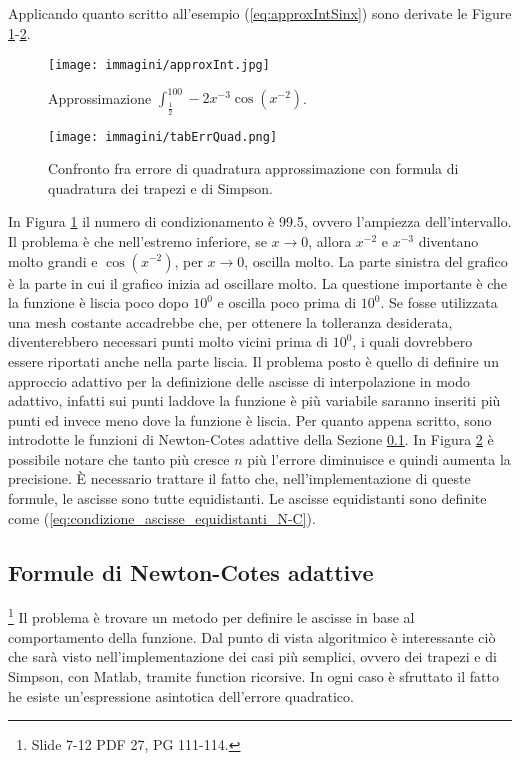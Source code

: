 Applicando quanto scritto all'esempio (\ref{eq:approxIntSinx}) sono derivate le Figure \ref{fig:approxInt}-\ref{fig:tabErrQuad}.

\begin{figure}
    \centering
    \texttt{[image: immagini/approxInt.jpg]}
    \caption{Approssimazione $\int_{\frac{1}{2}}^{100}-2x^{-3}\cos(x^{-2})$.}\label{fig:approxInt}
\end{figure}

\begin{figure}
    \centering
    \texttt{[image: immagini/tabErrQuad.png]}
    \caption{Confronto fra errore di quadratura approssimazione con formula di quadratura dei trapezi e di Simpson.}\label{fig:tabErrQuad}
\end{figure}

In Figura \ref{fig:approxInt} il numero di condizionamento è 99.5, ovvero l'ampiezza dell'intervallo. Il problema è che nell'estremo inferiore, se $x\rightarrow 0$, allora $x^{-2}$ e $x^{-3}$ diventano molto grandi e $\cos{(x^{-2})}$, per $x\rightarrow 0$, oscilla molto. La parte sinistra del grafico è la parte in cui il grafico inizia ad oscillare molto. La questione importante è che la funzione è liscia poco dopo $10^0$ e oscilla poco prima di $10^0$. Se fosse utilizzata una mesh costante accadrebbe che, per ottenere la tolleranza desiderata, diventerebbero necessari punti molto vicini prima di $10^0$, i quali dovrebbero essere riportati anche nella parte liscia. Il problema posto è quello di definire un approccio adattivo per la definizione delle ascisse di interpolazione in modo adattivo, infatti sui punti laddove la funzione è più variabile saranno inseriti più punti ed invece meno dove la funzione è liscia. Per quanto appena scritto, sono introdotte le funzioni di Newton-Cotes adattive della Sezione \ref{ssec:formN-CAdatt}.
In Figura \ref{fig:tabErrQuad} è possibile notare che tanto più cresce $n$ più l'errore diminuisce e quindi aumenta la precisione. È necessario trattare il fatto che, nell'implementazione di queste formule, le ascisse sono tutte equidistanti. Le ascisse equidistanti sono definite come (\ref{eq:condizione_ascisse_equidistanti_N-C}).

\subsection{Formule di Newton-Cotes adattive}\label{ssec:formN-CAdatt}
\footnote{Slide 7-12 PDF 27, PG 111-114.}
Il problema è trovare un metodo per definire le ascisse in base al comportamento della funzione. Dal punto di vista algoritmico è interessante ciò che sarà visto nell'implementazione dei casi più semplici, ovvero dei trapezi e di Simpson, con Matlab, tramite function ricorsive. In ogni caso è sfruttato il fatto he esiste un'espressione asintotica dell'errore quadratico.


